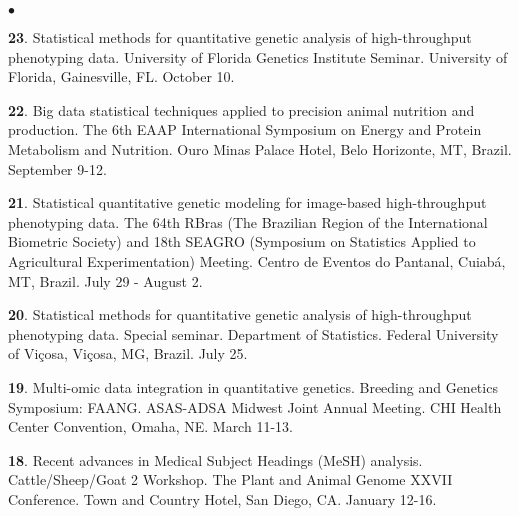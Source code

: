 \documentclass[margin,line,10pt]{res}
\newenvironment{list2}{
  \begin{list}{$\bullet$}{%
      \setlength{\itemsep}{0in}
      \setlength{\parsep}{0in} \setlength{\parskip}{0in}
      \setlength{\topsep}{0in} \setlength{\partopsep}{0in} 
      \setlength{\leftmargin}{0.2in}}}{\end{list}}
\begin{document}
\begin{resume}
\begin{list2}
  \item [{\bf 23}.] Statistical methods for quantitative genetic analysis of high-throughput phenotyping data.  University of Florida Genetics Institute Seminar. University of Florida, Gainesville, FL. October 10.

    \vspace{0.5cm}
    
\item [{\bf 22}.]  Big data statistical techniques applied to precision animal nutrition and production. The 6th EAAP International Symposium on Energy and Protein Metabolism and Nutrition. Ouro Minas Palace Hotel, Belo Horizonte, MT, Brazil. September 9-12.

  \vspace{0.5cm}
  
 \item [{\bf 21}.] Statistical quantitative genetic modeling for image-based high-throughput phenotyping data. The 64th RBras (The Brazilian  Region  of the International Biometric Society) and 18th SEAGRO (Symposium on Statistics Applied to Agricultural Experimentation) Meeting. Centro de Eventos do Pantanal, Cuiab{\'a}, MT, Brazil. July 29 - August 2.

   \vspace{0.5cm}

   
 \item [{\bf 20}.]      
     Statistical methods for quantitative genetic analysis of high-throughput phenotyping data. Special seminar. Department of Statistics. Federal University of Vi\c cosa, Vi\c cosa, MG, Brazil. July 25.
   
    
   \vspace{0.5cm}
   
   \item [{\bf 19}.]  Multi-omic data integration in quantitative genetics. Breeding and Genetics Symposium: FAANG. ASAS-ADSA Midwest Joint Annual Meeting. CHI Health Center Convention, Omaha, NE. March 11-13.

  \vspace{0.5cm}

 \item [{\bf 18}.] Recent advances in Medical Subject Headings (MeSH) analysis. Cattle/Sheep/Goat 2 Workshop. The Plant and Animal Genome XXVII Conference. Town and Country Hotel, San Diego, CA. January 12-16.

\end{list2}

  
  

\end{resume}
\end{document}

